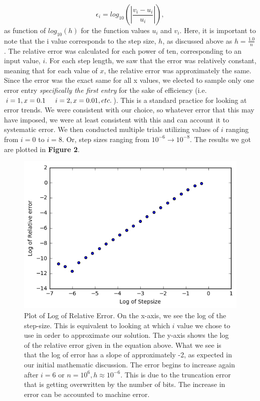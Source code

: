 \documentclass{article}
\begin{document}
\[
\epsilon_i=log_{10}\left(\left|\frac{v_i-u_i}
{u_i}\right|\right),
\]
as function of $log_{10}(h)$ for the function values $u_i$ and $v_i$. Here, it is important to note that the i value corresponds to the step size, $h$, as discussed above as $h = \frac{1.0}{n}$. The relative error was calculated for each power of ten, corresponding to an input value, $i$.
For each step length, we saw that the error was relatively constant, meaning that for each value of $x$, the relative error was approximately the same. Since the error was the exact same for all x values, we elected to sample only one error entry \textit{ specifically the first entry} for the sake of efficiency (i.e. $i=1, x= 0.1 \hspace{0.5cm} i=2, x = 0.01, etc.$). This is a standard practice for looking at error trends. We were consistent with our choice, so whatever error that this may have imposed, we were at least consistent with this and can account it to systematic error. We then conducted multiple trials utilizing values of $i$ ranging from $i=0$ to $i=8$. Or, step sizes ranging from $10^{-6} \rightarrow 10^{-8}$. The results we got are plotted in \textbf{Figure 2}.

\begin{figure}[h!]
	\includegraphics[width=\linewidth]{PHY480_P1_RerrvSs.png}
	\caption{Plot of Log of Relative Error. On the x-axis, we see the log of the step-size. This is equivalent to looking at which $i$ value we chose to use in order to approximate our solution. The y-axis shows the log of the relative error given in the equation above. What we see is that the log of error has a slope of approximately -2, as expected in our initial mathematic discussion. The error begins to increase again after $i=6$ or $n=10^{6}, h \approx 10^{-6}$. This is due to the truncation error that is getting overwritten by the number of bits. The increase in error can be accounted to machine error.}
	\label{fig:errorplot}
\end{figure}
\end{document}
